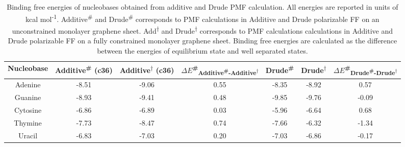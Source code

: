 \begin{landscape}
    \begin{table}
        \centering
        \small
        \caption[Binding free energies of nucleobases obtained from additive and Drude PMF calculation for unconstrained and constrained monolayer graphene sheet]{Binding free energies of nucleobases obtained from additive and Drude PMF calculation. All energies are reported in units of kcal mol\textsuperscript{-1}. Additive\textsuperscript{\#} and Drude\textsuperscript{\#} corresponds to PMF calculations in Additive and Drude polarizable FF on an unconstrained monolayer graphene sheet. Add\textsuperscript{$\dagger$} and Drude\textsuperscript{$\dagger$} corresponds to PMF calculations calculations in Additive and Drude polarizable FF on a fully constrained monolayer graphene sheet. Binding free energies are calculated as the difference between the energies of equilibrium state and well separated states.}
        \begin{tabular}{ccccccc}
           \toprule
           Nucleobase  &   Additive\textsuperscript{\#} (c36)  &   Additive\textsuperscript{$\dagger$} (c36)   &   $\Delta{E}$\textsuperscript{\#}\textsubscript{Additive\textsuperscript{\#}-Additive\textsuperscript{$\dagger$}} &   Drude\textsuperscript{\#}   &   Drude\textsuperscript{$\dagger$}    &   $\Delta{E}$\textsuperscript{\#}\textsubscript{Drude\textsuperscript{\#}-Drude\textsuperscript{$\dagger$}}     \\ \midrule
           Adenine  & -8.51 & -9.06 & 0.55 & -8.35 & -8.92 & 0.57  \\
           Guanine  & -8.93 & -9.41 & 0.48 & -9.85 & -9.76 & -0.09 \\
           Cytosine & -6.86 & -6.89 & 0.03 & -5.96 & -6.64 & 0.68  \\
           Thymine  & -7.73 & -8.47 & 0.74 & -7.66 & -6.32 & -1.34 \\
           Uracil   & -6.83 & -7.03 & 0.20 & -7.03 & -6.86 & -0.17 \\ \bottomrule
        \end{tabular}
        \label{tab:my_label}
    \end{table}
 \end{landscape}

